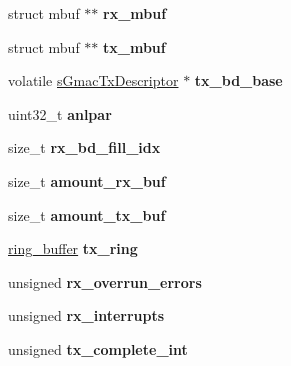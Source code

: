 \begin{DoxyCompactItemize}
struct mbuf $\ast$$\ast$ {\bfseries rx\+\_\+mbuf}
\item 
\mbox{\label{structif__atsam__softc_a8b114159b04fde2d9737ec9a90c8a6a9}} 
struct mbuf $\ast$$\ast$ {\bfseries tx\+\_\+mbuf}
\item 
\mbox{\label{structif__atsam__softc_a58acfdc6eaeb018a440f6be9b3a353c6}} 
volatile \mbox{\hyperlink{group__gmac__structs_ga69a2b24578edebf2e816c4d3ca20edeb}{s\+Gmac\+Tx\+Descriptor}} $\ast$ {\bfseries tx\+\_\+bd\+\_\+base}
\item 
\mbox{\label{structif__atsam__softc_a53bc2a57f583adeb7ea25c09e5dc6147}} 
uint32\+\_\+t {\bfseries anlpar}
\item 
\mbox{\label{structif__atsam__softc_ad068144500cc6986c54fce136ed8363f}} 
size\+\_\+t {\bfseries rx\+\_\+bd\+\_\+fill\+\_\+idx}
\item 
\mbox{\label{structif__atsam__softc_af4100818b7eca796a0465baca84701ec}} 
size\+\_\+t {\bfseries amount\+\_\+rx\+\_\+buf}
\item 
\mbox{\label{structif__atsam__softc_a40605782190ac1022d86b131716c3245}} 
size\+\_\+t {\bfseries amount\+\_\+tx\+\_\+buf}
\item 
\mbox{\label{structif__atsam__softc_ac263deda5e69387e9a23cc33c51f2646}} 
\mbox{\hyperlink{structring__buffer}{ring\+\_\+buffer}} {\bfseries tx\+\_\+ring}
\item 
\mbox{\label{structif__atsam__softc_a986e8ca5e0ede5553c8d1777c3118433}} 
unsigned {\bfseries rx\+\_\+overrun\+\_\+errors}
\item 
\mbox{\label{structif__atsam__softc_ae49106569698360eb25424e0d02b7aee}} 
unsigned {\bfseries rx\+\_\+interrupts}
\item 
\mbox{\label{structif__atsam__softc_ac735c48061f3bc213914086213232ddb}} 
unsigned {\bfseries tx\+\_\+complete\+\_\+int}
\item 
\mbox{\label{structif__atsam__softc_a5156a733d1d01fc33d003af49fd311ac}} 

\end{DoxyCompactItemize}

